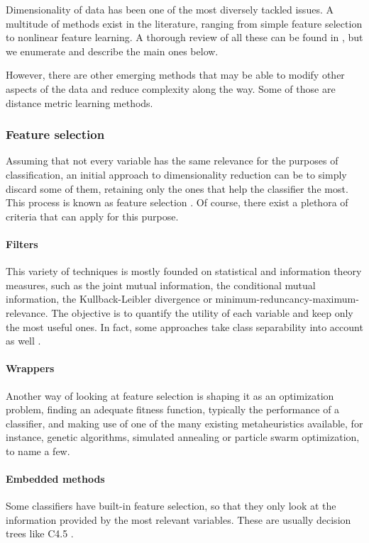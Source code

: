 Dimensionality of data has been one of the most diversely tackled issues. A multitude of methods exist in the literature, ranging from simple feature selection to nonlinear feature learning. A thorough review of all these can be found in , but we enumerate and describe the main ones below.

However, there are other emerging methods that may be able to modify other aspects of the data and reduce complexity along the way. Some of those are distance metric learning methods.

\subsubsection{Feature selection}

Assuming that not every variable has the same relevance for the purposes of classification, an initial approach to dimensionality reduction can be to simply discard some of them, retaining only the ones that help the classifier the most. This process is known as feature selection . Of course, there exist a plethora of criteria that can apply for this purpose.

\paragraph*{Filters} This variety of techniques is mostly founded on statistical and information theory measures, such as the joint mutual information, the conditional mutual information, the Kullback-Leibler divergence or minimum-reduncancy-maximum-relevance. The objective is to quantify the utility of each variable and keep only the most useful ones. In fact, some approaches take class separability into account as well .

\paragraph*{Wrappers} Another way of looking at feature selection is shaping it as an optimization problem, finding an adequate fitness function, typically the performance of a classifier, and making use of one of the many existing metaheuristics available, for instance, genetic algorithms, simulated annealing or particle swarm optimization, to name a few.

\paragraph*{Embedded methods} Some classifiers have built-in feature selection, so that they only look at the information provided by the most relevant variables. These are usually decision trees like C4.5 .

